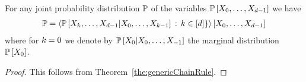 \begin{theorem}\label{the:chainRule}
	For any joint probability distribution $\mathbb{P}$ of the variables $\mathbb{P}\left[X_{0},\ldots,X_{d-1}\right]$ we have
	\begin{align*}
		\mathbb{P} = \left\langle \mathbb{P}\left[X_{k},\ldots,X_{d-1}|X_{0},\ldots,X_{k-1}\right]\, : \, k\in[d]\}\right\rangle \left[ X_{0},\ldots,X_{d-1} \right] 
	\end{align*}
	where for $k=0$ we denote by $ \mathbb{P}\left[X_{0}|X_{0},\ldots,X_{-1}\right]$ the marginal distribution $\mathbb{P}\left[X_{0}\right]$.
\end{theorem}
\begin{proof}
	This follows from Theorem~\ref{the:genericChainRule}.
\end{proof}






